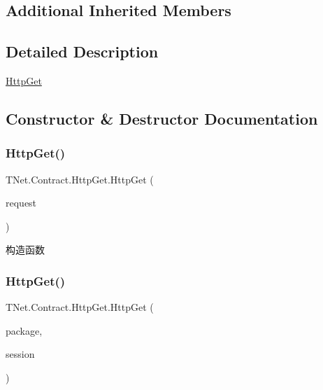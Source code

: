 \subsection*{Additional Inherited Members}


\subsection{Detailed Description}
\mbox{\hyperlink{class_t_net_1_1_contract_1_1_http_get}{Http\+Get}} 



\subsection{Constructor \& Destructor Documentation}
\mbox{\label{class_t_net_1_1_contract_1_1_http_get_ab2b281b01c8c18b90d38a6d7b190a400}} 
\subsubsection{\texorpdfstring{Http\+Get()}{HttpGet()}\hspace{0.1cm}{\footnotesize\ttfamily [1/2]}}
{\footnotesize\ttfamily T\+Net.\+Contract.\+Http\+Get.\+Http\+Get (\begin{DoxyParamCaption}\item[{Http\+Request}]{request }\end{DoxyParamCaption})}



构造函数 

\mbox{\label{class_t_net_1_1_contract_1_1_http_get_a07b82879b0d4a56ba56fc861df59b304}} 
\subsubsection{\texorpdfstring{Http\+Get()}{HttpGet()}\hspace{0.1cm}{\footnotesize\ttfamily [2/2]}}
{\footnotesize\ttfamily T\+Net.\+Contract.\+Http\+Get.\+Http\+Get (\begin{DoxyParamCaption}\item[{\mbox{\hyperlink{class_t_net_1_1_contract_1_1_request_package}{Request\+Package}}}]{package,  }\item[{\mbox{\hyperlink{class_t_net_1_1_contract_1_1_game_session}{Game\+Session}}}]{session }\end{DoxyParamCaption})}






